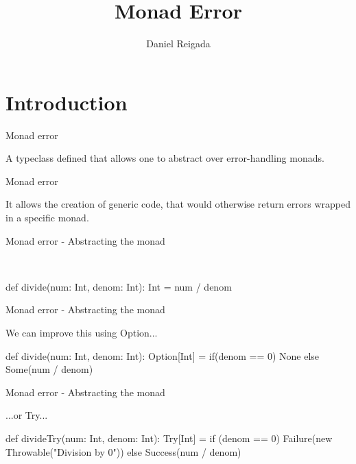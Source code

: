 \documentclass[13pt]{beamer}
\title{Monad Error}
\subtitle{}
\author{Daniel Reigada}
\institute{Codacy}
\begin{document}
\maketitle

\section{Introduction}

\begin{frame}{Monad error}

  A typeclass defined that allows one to abstract over error-handling monads. \\


\end{frame}

\begin{frame}{Monad error}

  It allows the creation of generic code, that would otherwise return errors wrapped in a specific monad. \\

\end{frame}

\begin{frame}[fragile]{Monad error - Abstracting the monad}
  
   \\ 

  \begin{scalaCode}
    def divide(num: Int, denom: Int): Int = num / denom
  \end{scalaCode}

\end{frame}

\begin{frame}[fragile]{Monad error - Abstracting the monad}

  We can improve this using Option...

  \begin{scalaCode}
    def divide(num: Int, denom: Int): Option[Int] =
      if(denom == 0) None else Some(num / denom)
  \end{scalaCode}

\end{frame}

\begin{frame}[fragile]{Monad error - Abstracting the monad}

  ...or Try...

  \begin{scalaCode}
    def divideTry(num: Int, denom: Int): Try[Int] =
      if (denom == 0) Failure(new Throwable("Division by 0"))
      else Success(num / denom)
  \end{scalaCode}

\end{frame}
\end{document}
